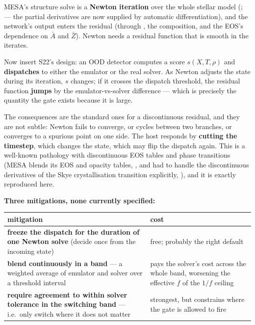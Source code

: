 MESA's structure solve is a \textbf{Newton iteration} over the whole stellar
model (\citealt[\S 6]{paxton2011}; \citealt{jermyn2023} --- the partial
derivatives are now supplied by automatic differentiation), and the network's
output enters the residual (through \enuc, the composition, and the EOS's
dependence on $\bar A$ and $\bar Z$). Newton needs a residual function that is
smooth in the iterates.

Now insert S22's design: an OOD detector computes a score $s(X, T, \rho)$ and
\textbf{dispatches} to either the emulator or the real solver. As Newton adjusts
the state during its iteration, $s$ changes; if it crosses the dispatch
threshold, the residual function \textbf{jumps} by the emulator-vs-solver
difference --- which is precisely the quantity the gate exists because it is
large.

The consequences are the standard ones for a discontinuous residual, and they
are not subtle: Newton fails to converge, or cycles between two branches, or
converges to a spurious point on one side. The host responds by \textbf{cutting
the timestep}, which changes the state, which may flip the dispatch again. This
is a well-known pathology with discontinuous EOS tables and phase transitions
(MESA blends its EOS and opacity tables, \citealt{paxton2011}, and had to
handle the discontinuous derivatives of the Skye crystallisation transition
explicitly, \citealt{jermyn2023}), and it is exactly reproduced here.

\textbf{Three mitigations, none currently specified:}

\begingroup
\small
\begin{tabularx}{\textwidth}{@{}L{7.2cm} Y@{}}
\toprule
\textbf{mitigation} & \textbf{cost} \\
\midrule
\textbf{freeze the dispatch for the duration of one Newton solve} (decide once
  from the incoming state) &
  free; probably the right default \\
\textbf{blend continuously in a band} --- a weighted average of emulator and
  solver over a threshold interval &
  pays the solver's cost across the whole band, worsening the effective $f$ of
  the $1/f$ ceiling \\
\textbf{require agreement to within solver tolerance in the switching band}
  --- i.e.\ only switch where it does not matter &
  strongest, but constrains where the gate is allowed to fire \\
\bottomrule
\end{tabularx}
\endgroup


